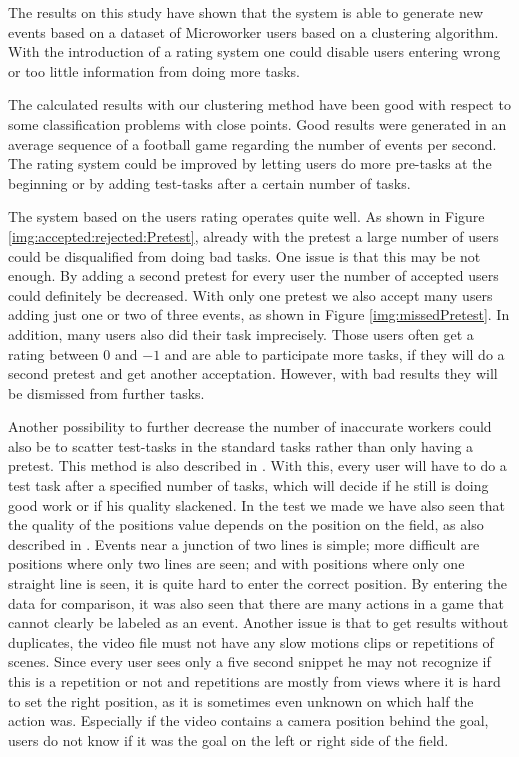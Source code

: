 The results on this study have shown that the system is able to generate new events based on a dataset of Microworker users based on a clustering algorithm. With the introduction of a rating system one could disable users entering wrong or too little information from doing more tasks.

The calculated results with our clustering method have been good with respect to some classification problems with close points. Good results were generated in an average sequence of a football game regarding the number of events per second.
The rating system could be improved by letting users do more pre-tasks at the beginning or by adding test-tasks after a certain number of tasks.

The system based on the users rating operates quite well. As shown in Figure \ref{img:accepted:rejected:Pretest}, already with the pretest a large number of users could be disqualified from doing bad tasks.
One issue is that this may be not enough. By adding a second pretest for every user the number of accepted users could definitely be decreased. With only one pretest we also accept many users adding just one or two of three events, as shown in Figure \ref{img:missedPretest}. In addition, many users also did their task imprecisely. Those users often get a rating between $0$ and $-1$ and are able to participate more tasks, if they will do a second pretest and get another acceptation. However, with bad results they will be dismissed from further tasks.

Another possibility to further decrease the number of inaccurate workers could also be to scatter test-tasks in the standard tasks rather than only having a pretest. This method is also described in \cite{Liu:2013}. With this, every user will have to do a test task after a specified number of tasks, which will decide if he still is doing good work or if his quality slackened.
\newline
In the test we made we have also seen that the quality of the positions value depends on the position on the field, as also described in \cite{Perin:2013}. Events near a junction of two lines is simple; more difficult are positions where only two lines are seen; and with positions where only one straight line is seen, it is quite hard to enter the correct position.
By entering the data for comparison, it was also seen that there are many actions in a game that cannot clearly be labeled as an event.
Another issue is that to get results without duplicates, the video file must not have any slow motions clips or repetitions of scenes. Since every user sees only a five second snippet he may not recognize if this is a repetition or not and repetitions are mostly from views where it is hard to set the right position, as it is sometimes even unknown on which half the action was. Especially if the video contains a camera position behind the goal, users do not know if it was the goal on the left or right side of the field.

